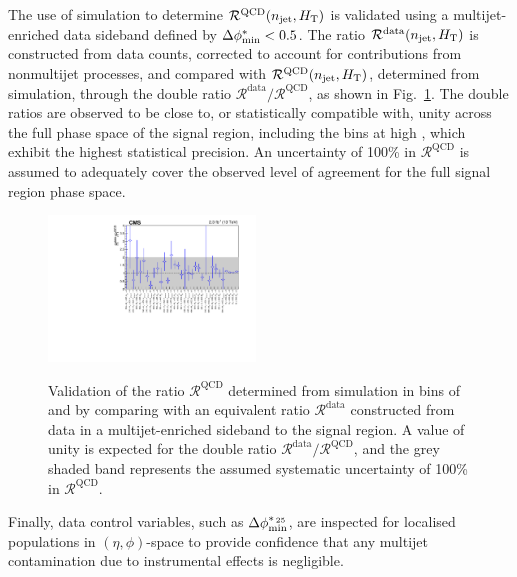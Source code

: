 The use of simulation to determine $\mathcal{R}^\text{QCD}(n_{\text{jet}},
H_{\mathrm{T}})$ is validated using a multijet-enriched data sideband defined
by $\mbox{$\Delta\phi^{*}_{\rm min}$} < 0.5$.
The ratio $\mathcal{R}^\text{data}(n_{\text{jet}}, H_{\mathrm{T}})$ is constructed
from data counts, corrected to account for contributions from
nonmultijet processes, and compared with
$\mathcal{R}^\text{QCD}(n_{\text{jet}}, H_{\mathrm{T}})$, determined from simulation,
through the double ratio
$\mathcal{R}^\text{data}/\mathcal{R}^\text{QCD}$, as shown in
Fig.~\ref{fig:qcd}. The double ratios are observed to be close to, or
statistically compatible with, unity across the full phase space of
the signal region, including the bins at high \scalht, which exhibit
the highest statistical precision. An uncertainty of 100\% in
$\mathcal{R}^\text{QCD}$ is assumed to adequately cover the observed
level of agreement for the full signal region phase space.

\begin{figure}[!t]
  \begin{center}
    \includegraphics[width=0.49\textwidth]{figures/qcd/v1/DoubleRatioQCD_noEmpty} \\
  \end{center}
  \caption{Validation of the ratio $\mathcal{R}^\text{QCD}$ determined
    from simulation in bins of \njet and \scalht by comparing with an
    equivalent ratio $\mathcal{R}^\text{data}$ constructed from data 
    in a multijet-enriched sideband to the signal region. A value of
    unity is expected for the double ratio $\mathcal{R}^\text{data} /
    \mathcal{R}^\text{QCD}$, and the grey shaded band represents the
    assumed systematic uncertainty of 100\% in
    $\mathcal{R}^\text{QCD}$. 
  }
  \label{fig:qcd} 
\end{figure}

Finally, data control variables, such as $\mbox{$\Delta\phi^{*_{\, 25}}_{\rm min}$}$, are inspected
for localised populations in $(\eta,\phi)$-space to provide confidence
that any multijet contamination due to instrumental effects is
negligible.

